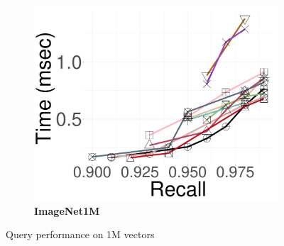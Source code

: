 \begin{figure}[!htb]
\begin{subfigure}{\soneM\textwidth}
	\end{subfigure}
   \hspace{0.4cm}
 	\begin{subfigure}{\soneM\textwidth}
		\centering
		\includegraphics[width=\textwidth]{../img/Experiments/search/1M/imagenet_10nn.pdf}
		\caption{\textbf{ImageNet1M}} 
		\label{fig:elpis:query:performance:1M:imagenet:10NN}
	\end{subfigure}
	\vspace*{-0.2cm}
	\caption{Query performance on 1M vectors}	
	\vspace*{-0.2cm}
	\label{fig:elpis:query:performance:1M}
\end{figure}


